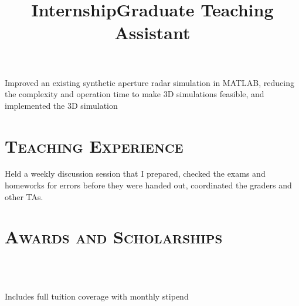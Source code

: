 \begin{resume}
	\title{Internship}
	\begin{position}
		Improved an existing synthetic aperture radar simulation in MATLAB, reducing
    the complexity and operation time to make 3D simulations feasible, and
    implemented the 3D simulation 
	\end{position}
	
	
	\section{\textsc{Teaching Experience}}
	
	\title{Graduate Teaching Assistant}
	\begin{position}
		Held a weekly discussion session that I prepared, checked the exams and
    homeworks for errors before they were handed out, coordinated the graders
    and other TAs. 
	\end{position}
	
	
	\section{\textsc{Awards and Scholarships}}
	
	\begin{formatb}
		\\
		\body\\
	\end{formatb}
	
	\begin{position}
		Includes full tuition coverage with monthly stipend
	\end{position}
	

\end{resume}
